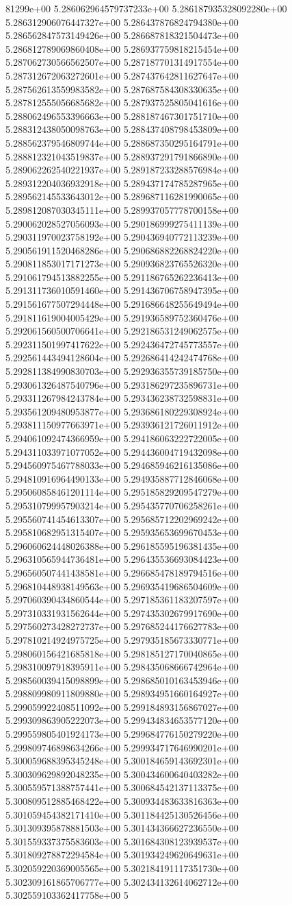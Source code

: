 81299e+00	5.286062964579737233e+00	5.286187935328092280e+00	5.286312906076447327e+00	5.286437876824794380e+00	5.286562847573149426e+00	5.286687818321504473e+00	5.286812789069860408e+00	5.286937759818215454e+00	5.287062730566562507e+00	5.287187701314917554e+00	5.287312672063272601e+00	5.287437642811627647e+00	5.287562613559983582e+00	5.287687584308330635e+00	5.287812555056685682e+00	5.287937525805041616e+00	5.288062496553396663e+00	5.288187467301751710e+00	5.288312438050098763e+00	5.288437408798453809e+00	5.288562379546809744e+00	5.288687350295164791e+00	5.288812321043519837e+00	5.288937291791866890e+00	5.289062262540221937e+00	5.289187233288576984e+00	5.289312204036932918e+00	5.289437174785287965e+00	5.289562145533643012e+00	5.289687116281990065e+00	5.289812087030345111e+00	5.289937057778700158e+00	5.290062028527056093e+00	5.290186999275411139e+00	5.290311970023758192e+00	5.290436940772113239e+00	5.290561911520468286e+00	5.290686882268824220e+00	5.290811853017171273e+00	5.290936823765526320e+00	5.291061794513882255e+00	5.291186765262236413e+00	5.291311736010591460e+00	5.291436706758947395e+00	5.291561677507294448e+00	5.291686648255649494e+00	5.291811619004005429e+00	5.291936589752360476e+00	5.292061560500706641e+00	5.292186531249062575e+00	5.292311501997417622e+00	5.292436472745773557e+00	5.292561443494128604e+00	5.292686414242474768e+00	5.292811384990830703e+00	5.292936355739185750e+00	5.293061326487540796e+00	5.293186297235896731e+00	5.293311267984243784e+00	5.293436238732598831e+00	5.293561209480953877e+00	5.293686180229308924e+00	5.293811150977663971e+00	5.293936121726011912e+00	5.294061092474366959e+00	5.294186063222722005e+00	5.294311033971077052e+00	5.294436004719432098e+00	5.294560975467788033e+00	5.294685946216135086e+00	5.294810916964490133e+00	5.294935887712846068e+00	5.295060858461201114e+00	5.295185829209547279e+00	5.295310799957903214e+00	5.295435770706258261e+00	5.295560741454613307e+00	5.295685712202969242e+00	5.295810682951315407e+00	5.295935653699670453e+00	5.296060624448026388e+00	5.296185595196381435e+00	5.296310565944736481e+00	5.296435536693084423e+00	5.296560507441438581e+00	5.296685478189794516e+00	5.296810448938149563e+00	5.296935419686504609e+00	5.297060390434860544e+00	5.297185361183207597e+00	5.297310331931562644e+00	5.297435302679917690e+00	5.297560273428272737e+00	5.297685244176627783e+00	5.297810214924975725e+00	5.297935185673330771e+00	5.298060156421685818e+00	5.298185127170040865e+00	5.298310097918395911e+00	5.298435068666742964e+00	5.298560039415098899e+00	5.298685010163453946e+00	5.298809980911809880e+00	5.298934951660164927e+00	5.299059922408511092e+00	5.299184893156867027e+00	5.299309863905222073e+00	5.299434834653577120e+00	5.299559805401924173e+00	5.299684776150279220e+00	5.299809746898634266e+00	5.299934717646990201e+00	5.300059688395345248e+00	5.300184659143692301e+00	5.300309629892048235e+00	5.300434600640403282e+00	5.300559571388757441e+00	5.300684542137113375e+00	5.300809512885468422e+00	5.300934483633816363e+00	5.301059454382171410e+00	5.301184425130526456e+00	5.301309395878881503e+00	5.301434366627236550e+00	5.301559337375583603e+00	5.301684308123939537e+00	5.301809278872294584e+00	5.301934249620649631e+00	5.302059220369005565e+00	5.302184191117351730e+00	5.302309161865706777e+00	5.302434132614062712e+00	5.302559103362417758e+00	5